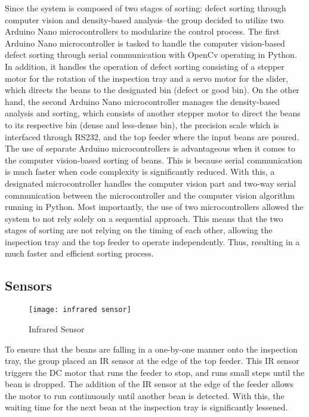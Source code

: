Since the system is composed of two stages of sorting: defect sorting through computer vision and density-based analysis–the group decided to utilize two Arduino Nano microcontrollers to modularize the control process. The first Arduino Nano microcontroller is tasked to handle the computer vision-based defect sorting through serial communication with OpenCv operating in Python. In addition, it handles the operation of defect sorting consisting of a stepper motor for the rotation of the inspection tray and a servo motor for the slider, which directs the beans to the designated bin (defect or good bin). On the other hand, the second Arduino Nano microcontroller manages the density-based analysis and sorting, which consists of another stepper motor to direct the beans to its respective bin (dense and less-dense bin), the precision scale which is interfaced through RS232, and the top feeder where the input beans are poured. The use of separate Arduino microcontrollers is advantageous when it comes to the computer vision-based sorting of beans. This is because serial communication is much faster when code complexity is significantly reduced. With this, a designated microcontroller handles the computer vision part and two-way serial communication between the microcontroller and the computer vision algorithm running in Python. Most importantly, the use of two microcontrollers allowed the system to not rely solely on a sequential approach. This means that the two stages of sorting are not relying on the timing of each other, allowing the inspection tray and the top feeder to operate independently. Thus, resulting in a much faster and efficient sorting process. 

\subsection{Sensors}

\begin{figure}[h]
    \centering
    \texttt{[image: infrared sensor]} %
    \caption{Infrared Sensor}
    \label{fig:infrared_sensor}
\end{figure}

To ensure that the beans are falling in a one-by-one manner onto the inspection tray, the group placed an IR sensor at the edge of the top feeder. This IR sensor triggers the DC motor that runs the feeder to stop, and runs small steps until the bean is dropped. The addition of the IR sensor at the edge of the feeder allows the motor to run continuously until another bean is detected. With this, the waiting time for the next bean at the inspection tray is significantly lessened. 

